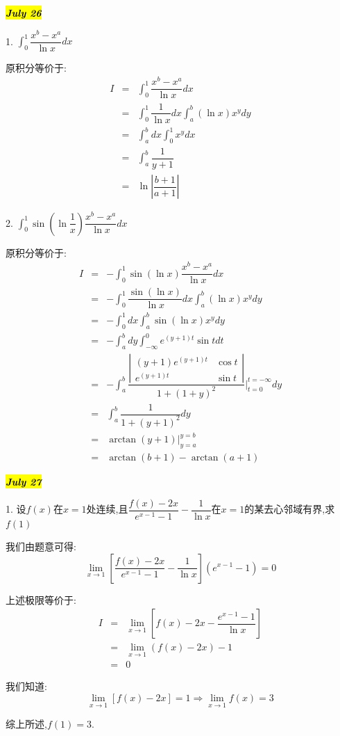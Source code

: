 \hl{\textbf{\textit{July 26}}}

1. $\int_{0}^{1}\dfrac{x^b-x^a}{\ln x}dx$
\begin{solution}
	
	原积分等价于: 
	\begin{eqnarray*}
		I&=&\int_{0}^{1}\dfrac{x^b-x^a}{\ln x}dx\\
		&=&\int_{0}^{1}\dfrac{1}{\ln x}dx\int_{a}^{b}(\ln x)x^{y}dy\\
		&=&\int_{a}^{b}dx\int_{0}^{1}x^{y}dx\\
		&=&\int_{a}^{b}\dfrac{1}{y+1}\\
		&=&\ln|\dfrac{b+1}{a+1}|
	\end{eqnarray*}
\end{solution}

2. $\int_{0}^{1}\sin (\ln\dfrac{1}{x})\dfrac{x^b-x^a}{\ln x}dx$
\begin{solution}
	
	原积分等价于: 
	\begin{eqnarray*}
		I&=&-\int_{0}^{1}\sin (\ln x)\dfrac{x^b-x^a}{\ln x}dx\\
		&=&-\int_{0}^{1}\dfrac{\sin (\ln x)}{\ln x}dx\int_{a}^{b}(\ln x)x^{y}dy\\
		&=&-\int_{0}^{1}dx\int_{a}^{b}\sin (\ln x)x^{y}dy\\
		&=&-\int_{a}^{b}dy\int_{-\infty}^{0}e^{(y+1)t}\sin tdt\\
		&=&-\int_{a}^{b}\dfrac{\left|\begin{matrix}
				(y+1)e^{(y+1)t}&\cos t\\e^{(y+1)t}&\sin t
			\end{matrix} \right| }{1+(1+y)^2}|_{t=0}^{t=-\infty}dy\\
		&=&\int_{a}^{b}\dfrac{1}{1+(y+1)^2}dy\\
		&=&\arctan (y+1)|_{y=a}^{y=b}\\
		&=&\arctan(b+1)-\arctan(a+1)
	\end{eqnarray*}
\end{solution}

\hl{\textbf{\textit{July 27}}}

1. 设$f(x)$在$x=1$处连续,且$\dfrac{f(x)-2x}{e^{x-1}-1}-\dfrac{1}{\ln x}$在$x=1$的某去心邻域有界,求$f(1)$
\begin{solution}
	
	我们由题意可得: 
	$$\lim\limits_{x\rightarrow 1}[\dfrac{f(x)-2x}{e^{x-1}-1}-\dfrac{1}{\ln x}](e^{x-1}-1)=0$$
	
	上述极限等价于: 
	\begin{eqnarray*}
		I&=&\lim\limits_{x\rightarrow 1}[f(x)-2x-\dfrac{e^{x-1}-1}{\ln x}]\\
		&=&\lim\limits_{x\rightarrow 1}(f(x)-2x)-1\\
		&=&0
	\end{eqnarray*}
	
	我们知道: $$\lim\limits_{x\rightarrow 1}[f(x)-2x]=1\Rightarrow \lim\limits_{x\rightarrow 1}f(x)=3$$
	
	综上所述,$f(1)=3$.
\end{solution}

